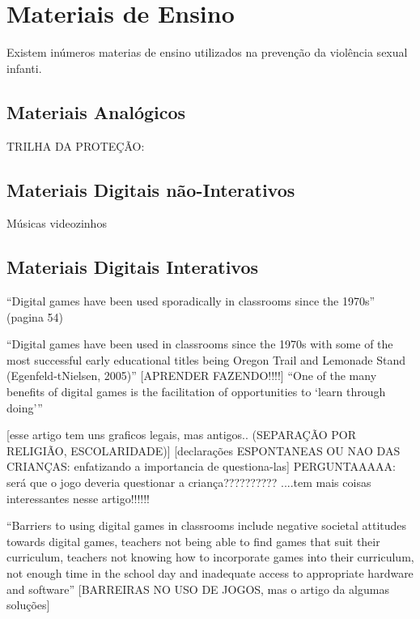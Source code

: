 


\section{Materiais de Ensino}\label{sec:materiais}

Existem inúmeros materias de ensino utilizados na prevenção da violência sexual infanti.

\subsection{Materiais Analógicos}\label{ssec:analogico}%


TRILHA DA PROTEÇÃO: \cite{meyer2017analise}

\subsection{Materiais Digitais não-Interativos}\label{ssec:digitais}%

Músicas videozinhos

\subsection{Materiais Digitais Interativos}\label{ssec:jogos}%


``Digital games have been used sporadically in classrooms since the 1970s'' (pagina 54) \cite{dip2016advancing}

``Digital games have been used in classrooms since the 1970s with some of the most successful early educational titles being Oregon Trail and Lemonade Stand (Egenfeld-tNielsen, 2005)''\cite{dip2016advancing}
[APRENDER FAZENDO!!!!]
``One of the many benefits of digital games is the facilitation of opportunities to ‘learn through doing’'' \cite{dip2016advancing}

[esse artigo tem uns graficos legais, mas antigos.. (SEPARAÇÃO POR RELIGIÃO, ESCOLARIDADE)] [declarações ESPONTANEAS OU NAO DAS CRIANÇAS: enfatizando a importancia de questiona-las] PERGUNTAAAAA: será que o jogo deveria questionar a criança?????????? \cite{cardoso2016abuso} ....tem mais coisas interessantes nesse artigo!!!!!!


``Barriers to using digital games in classrooms include negative societal attitudes towards digital games, teachers not being able to find games that suit their curriculum, teachers not knowing how to incorporate games into their curriculum, not enough time in the school day and inadequate access to appropriate hardware and software'' [BARREIRAS NO USO DE JOGOS, mas o artigo da algumas soluções] \cite{dip2016advancing}

